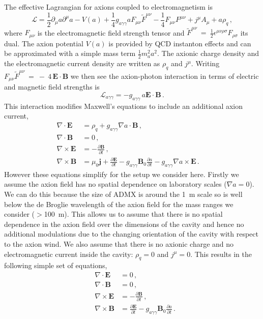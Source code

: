The effective Lagrangian for axions coupled to electromagnetism is
\begin{equation}
 \mathcal{L} = \frac{1}{2}\partial_\mu a \partial^\mu a - V(a) + \frac{1}{4}g_{a\gamma\gamma} a F_{\mu\nu}\tilde{F}^{\mu\nu}
    - \frac{1}{4}F_{\mu\nu}F^{\mu\nu} + j^\mu A_\mu + a\rho_q \, ,
\end{equation}
where $F_{\mu\nu}$ is the electromagnetic field strength tensor and $\tilde{F}^{\mu\nu}~=~\frac{1}{2}\epsilon^{\mu\nu\rho\sigma}F_{\rho\sigma}$ its dual. The axion potential $V(a)$ is provided by QCD instanton effects and can be approximated with a simple mass term $\frac{1}{2} m_a^2 a^2$. The axionic charge density and the electromagnetic current density are written as $\rho_q$ and $j^\mu$. Writing $F_{\mu\nu}\tilde{F}^{\mu\nu}~=~-~4\,\textbf{E}\cdot\textbf{B}$ we then see the axion-photon interaction in terms of electric and magnetic field strengths is
\begin{equation}
 \mathcal{L}_{a\gamma\gamma} = - g_{a\gamma\gamma}\, a \textbf{E}\cdot\textbf{B} \, .
\end{equation}
This interaction modifies Maxwell's equations to include an additional axion current,
\begin{eqnarray}
&\nabla \cdot \textbf{E} &= \rho_q + g_{a\gamma\gamma} \nabla a \cdot \textbf{B} \,, \\
&\nabla \cdot \textbf{B} &= 0 \,, \\
&\nabla \times \textbf{E} &= -\frac{\partial \textbf{B}}{\partial t}\,,  \\
&\nabla \times \textbf{B} &= \mu_0\textbf{j} + \frac{\partial \textbf{E}}{\partial t} - g_{a\gamma\gamma} \textbf{B}_0\frac{\partial a}{\partial t} - g_{a\gamma\gamma} \nabla a \times \textbf{E} \, .\quad\quad
\end{eqnarray}
However these equations simplify for the setup we consider here. Firstly we assume the axion field has no spatial dependence on laboratory scales ($\nabla a = 0$). We can do this because the size of ADMX is around the 1~m scale so is well below the de Broglie wavelength of the axion field for the mass ranges we consider ($>$100~m). This allows us to assume that there is no spatial dependence in the axion field over the dimensions of the cavity and hence no additional modulations due to the changing orientation of the cavity with respect to the axion wind. We also assume that there is no axionic charge and no electromagnetic current inside the cavity: $\rho_q = 0$ and $j^\mu = 0$. This results in the following simple set of equations,
\begin{eqnarray}
&\nabla \cdot \textbf{E} &= 0 \,, \\
&\nabla \cdot \textbf{B} &= 0 \,, \\
&\nabla \times \textbf{E} &= -\frac{\partial \textbf{B}}{\partial t} \,, \\
&\nabla \times \textbf{B} &= \frac{\partial \textbf{E}}{\partial t} - g_{a\gamma\gamma} \textbf{B}_0\frac{\partial a}{\partial t} \, .
\end{eqnarray}

